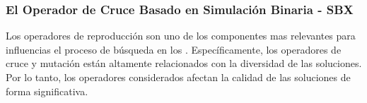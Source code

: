 \subsubsection{El Operador de Cruce Basado en Simulación Binaria - SBX}

Los operadores de reproducción son uno de los componentes mas relevantes para influencias el proceso de búsqueda en los \EAS{}.
%
Específicamente, los operadores de cruce y mutación están altamente relacionados con la diversidad de las soluciones.
%
Por lo tanto, los operadores considerados afectan la calidad de las soluciones de forma significativa.
%

